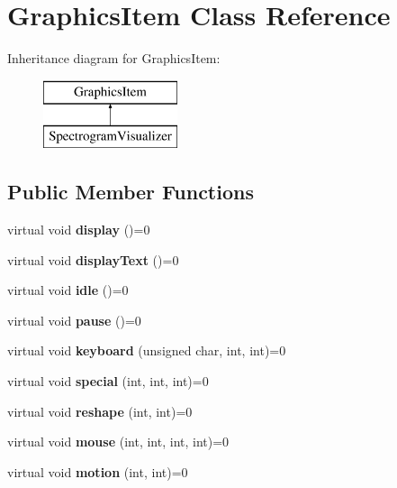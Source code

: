 \hypertarget{classGraphicsItem}{}\section{Graphics\+Item Class Reference}
\label{classGraphicsItem}
Inheritance diagram for Graphics\+Item\+:\begin{figure}[H]
\begin{center}
\leavevmode
\includegraphics[height=2.000000cm]{classGraphicsItem}
\end{center}
\end{figure}
\subsection*{Public Member Functions}
\begin{DoxyCompactItemize}
\item 
\hypertarget{classGraphicsItem_a297b8c4f6ee3d69523af5593d73264d4}{}\label{classGraphicsItem_a297b8c4f6ee3d69523af5593d73264d4} 
virtual void {\bfseries display} ()=0
\item 
\hypertarget{classGraphicsItem_ae452e1227c8a9ebcc44318a0966f38c9}{}\label{classGraphicsItem_ae452e1227c8a9ebcc44318a0966f38c9} 
virtual void {\bfseries display\+Text} ()=0
\item 
\hypertarget{classGraphicsItem_a91cd9e4283de204b004501482f5b6fc1}{}\label{classGraphicsItem_a91cd9e4283de204b004501482f5b6fc1} 
virtual void {\bfseries idle} ()=0
\item 
\hypertarget{classGraphicsItem_a01cc49913f553f0defe6817e124b3314}{}\label{classGraphicsItem_a01cc49913f553f0defe6817e124b3314} 
virtual void {\bfseries pause} ()=0
\item 
\hypertarget{classGraphicsItem_a8591c77fe00af4be64101d3533f1d9d7}{}\label{classGraphicsItem_a8591c77fe00af4be64101d3533f1d9d7} 
virtual void {\bfseries keyboard} (unsigned char, int, int)=0
\item 
\hypertarget{classGraphicsItem_abd982a2447785360e944f7a92db27a14}{}\label{classGraphicsItem_abd982a2447785360e944f7a92db27a14} 
virtual void {\bfseries special} (int, int, int)=0
\item 
\hypertarget{classGraphicsItem_a7c5b5fc7929ffad1514be846ae1737f1}{}\label{classGraphicsItem_a7c5b5fc7929ffad1514be846ae1737f1} 
virtual void {\bfseries reshape} (int, int)=0
\item 
\hypertarget{classGraphicsItem_ae55ed569dcaf7749ce160436626fb0c0}{}\label{classGraphicsItem_ae55ed569dcaf7749ce160436626fb0c0} 
virtual void {\bfseries mouse} (int, int, int, int)=0
\item 
\hypertarget{classGraphicsItem_a6351546854c4b6e37d389b37da8fce2d}{}\label{classGraphicsItem_a6351546854c4b6e37d389b37da8fce2d} 
virtual void {\bfseries motion} (int, int)=0
\end{DoxyCompactItemize}

